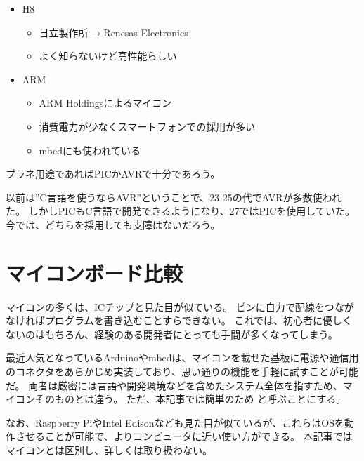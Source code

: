 \documentclass[letterpaper,10pt,dvipdfmx]{sphinxmanual}
\begin{document}
\begin{itemize}
\begin{itemize}
\begin{itemize}
\end{itemize}

\end{itemize}

\item {} 
H8
\begin{itemize}
\item {} 
日立製作所\(\rightarrow\)Renesas Electronics

\item {} 
よく知らないけど高性能らしい

\end{itemize}

\item {} 
ARM
\begin{itemize}
\item {} 
ARM Holdingsによるマイコン

\item {} 
消費電力が少なくスマートフォンでの採用が多い

\item {} 
mbedにも使われている

\end{itemize}

\end{itemize}

プラネ用途であればPICかAVRで十分であろう。

以前は''C言語を使うならAVR''ということで、23-25の代でAVRが多数使われた。
しかしPICもC言語で開発できるようになり、27ではPICを使用していた。
今では、どちらを採用しても支障はないだろう。


\section{マイコンボード比較}
\label{\detokenize{begginers/microcontroller:id4}}
マイコンの多くは、ICチップと見た目が似ている。
ピンに自力で配線をつながなければプログラムを書き込むことすらできない。
これでは、初心者に優しくないのはもちろん、経験のある開発者にとっても手間が多くなってしまう。

最近人気となっているArduinoやmbedは、マイコンを載せた基板に電源や通信用のコネクタをあらかじめ実装しており、思い通りの機能を手軽に試すことが可能だ。
両者は厳密には言語や開発環境などを含めたシステム全体を指すため、マイコンそのものとは違う。
ただ、本記事では簡単のため と呼ぶことにする。

なお、Raspberry PiやIntel
Edisonなども見た目が似ているが、これらはOSを動作させることが可能で、よりコンピュータに近い使い方ができる。
本記事ではマイコンとは区別し、詳しくは取り扱わない。
\end{document}
